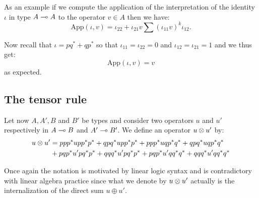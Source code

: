 As an example if we compute the application of the interpretation of the
identity \(\iota\) in type \(A\multimap A\) to the operator \(v\in A\) then
we have:
\begin{equation*}
\mathrm{App}(\iota, v) = \iota_{22} + \iota_{21}v\sum(\iota_{11}v)^k\iota_{12}.
\end{equation*}

Now recall that \(\iota = pq^* + qp^*\) so that
\(\iota_{11} = \iota_{22} = 0\) and \(\iota_{12} = \iota_{21} = 1\) and
we thus get:
\begin{equation*}
\mathrm{App}(\iota, v) = v
\end{equation*}
as expected.

\subsection{The tensor rule}\label{the-tensor-rule}

Let now \(A, A', B\) and \(B'\) be types and consider two operators
\(u\) and \(u'\) respectively in \(A\multimap B\) and \(A'\multimap B'\). We
define an operator \(u\otimes u'\) by:
\begin{align*}
    u\otimes u' &= ppp^*upp^*p^* + qpq^*upp^*p^* + ppp^*uqp^*q^* + qpq^*uqp^*q^*\\
              &+ pqp^*u'pq^*p^* + qqq^*u'pq^*p^* + pqp^*u'qq^*q^* + qqq^*u'qq^*q^*
  \end{align*}

Once again the notation is motivated by linear logic syntax and is
contradictory with linear algebra practice since what we denote by
\(u\otimes u'\) actually is the internalization of the direct sum
\(u\oplus u'\).

